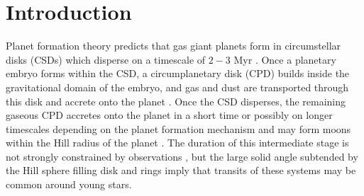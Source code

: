 \documentclass{aa} %
\begin{document}
   \maketitle
%


\section{Introduction}

Planet formation theory predicts that gas giant planets form in circumstellar disks (CSDs) which disperse on a timescale of $2-3$ Myr \citep{Williams11}. 
%
Once a planetary embryo forms within the CSD, a circumplanetary disk (CPD) builds inside the gravitational domain of the embryo, and gas and dust are transported through this disk and accrete onto the planet \citep[see reviews by e.g.][]{Armitage11,Kley12}.
%
Once the CSD disperses, the remaining gaseous CPD accretes onto the planet in a short time \citep{Szulagyi14,Perez15} or possibly on longer timescales depending on the planet formation mechanism \citep{Szulagyi17} and may form moons within the Hill radius of the planet \citep{Canup02}.
%
The duration of this intermediate stage is not strongly constrained by observations \citep[upper limits of millimetre-sized particles to CPDs around known exoplanets are reported in][]{Perez19}, but the large solid angle subtended by the Hill sphere filling disk and rings imply that transits of these systems may be common around young stars.
\end{document}
